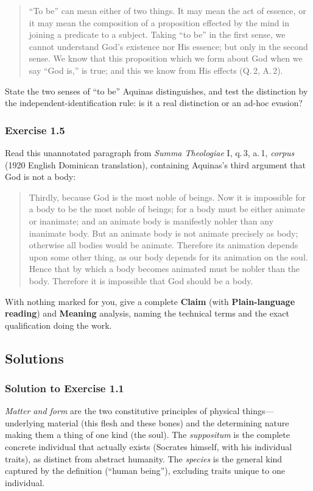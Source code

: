 \begin{quote}
``To be'' can mean either of two things. It may mean the act of essence, or it may mean the composition of a proposition effected by the mind in joining a predicate to a subject. Taking ``to be'' in the first sense, we cannot understand God's existence nor His essence; but only in the second sense. We know that this proposition which we form about God when we say ``God is,'' is true; and this we know from His effects (Q.\,2, A.\,2).
\end{quote}

State the two senses of ``to be'' Aquinas distinguishes, and test the distinction by the independent-identification rule: is it a real distinction or an ad-hoc evasion?

\subsubsection*{Exercise 1.5}
Read this unannotated paragraph from \emph{Summa Theologiae} I, q.\,3, a.\,1, \emph{corpus} (1920 English Dominican translation), containing Aquinas's third argument that God is not a body:

\begin{quote}
Thirdly, because God is the most noble of beings. Now it is impossible for a body to be the most noble of beings; for a body must be either animate or inanimate; and an animate body is manifestly nobler than any inanimate body. But an animate body is not animate precisely as body; otherwise all bodies would be animate. Therefore its animation depends upon some other thing, as our body depends for its animation on the soul. Hence that by which a body becomes animated must be nobler than the body. Therefore it is impossible that God should be a body.
\end{quote}

With nothing marked for you, give a complete \textbf{Claim} (with \textbf{Plain-language reading}) and \textbf{Meaning} analysis, naming the technical terms and the exact qualification doing the work.

\subsection{Solutions}

\subsubsection*{Solution to Exercise 1.1}
\emph{Matter and form} are the two constitutive principles of physical things---underlying material (this flesh and these bones) and the determining nature making them a thing of one kind (the soul). The \emph{suppositum} is the complete concrete individual that actually exists (Socrates himself, with his individual traits), as distinct from abstract humanity. The \emph{species} is the general kind captured by the definition (``human being''), excluding traits unique to one individual.

